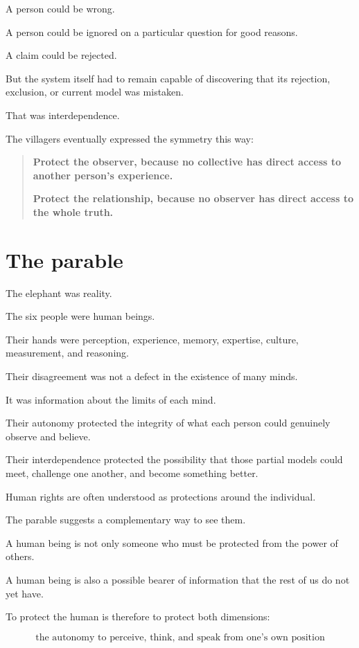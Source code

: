 \documentclass[11pt,a4paper]{article}
\begin{document}
A person could be wrong.

A person could be ignored on a particular question for good reasons.

A claim could be rejected.

But the system itself had to remain capable of discovering that its rejection, exclusion, or current model was mistaken.

That was interdependence.

The villagers eventually expressed the symmetry this way:

\begin{quote}
\textbf{Protect the observer, because no collective has direct access to another person's experience.}

\textbf{Protect the relationship, because no observer has direct access to the whole truth.}
\end{quote}

\section*{The parable}

The elephant was reality.

The six people were human beings.

Their hands were perception, experience, memory, expertise, culture, measurement, and reasoning.

Their disagreement was not a defect in the existence of many minds.

It was information about the limits of each mind.

Their autonomy protected the integrity of what each person could genuinely observe and believe.

Their interdependence protected the possibility that those partial models could meet, challenge one another, and become something better.

Human rights are often understood as protections around the individual.

The parable suggests a complementary way to see them.

A human being is not only someone who must be protected from the power of others.

A human being is also a possible bearer of information that the rest of us do not yet have.

To protect the human is therefore to protect both dimensions:

\[
\boxed{\text{the autonomy to perceive, think, and speak from one's own position}}
\]
\end{document}
